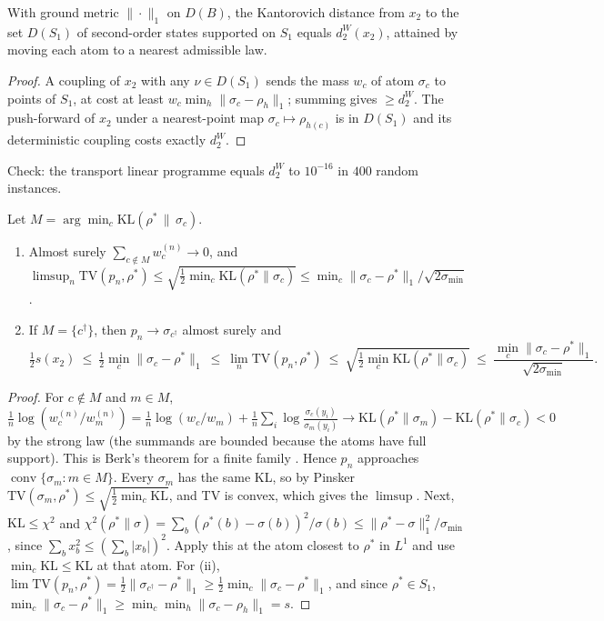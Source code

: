\begin{lemma}\label{lem:d2w}
With ground metric $\|\cdot\|_1$ on $D(B)$, the Kantorovich distance from $x_2$ to the set $D(S_1)$ of second-order states supported on $S_1$ equals $d_2^W(x_2)$, attained by moving each atom to a nearest admissible law.
\end{lemma}
\begin{proof}
A coupling of $x_2$ with any $\nu\in D(S_1)$ sends the mass $w_c$ of atom $\sigma_c$ to points of $S_1$, at cost at least $w_c\min_h\|\sigma_c-\rho_h\|_1$; summing gives $\ge d_2^W$. The push-forward of $x_2$ under a nearest-point map $\sigma_c\mapsto\rho_{h(c)}$ is in $D(S_1)$ and its deterministic coupling costs exactly $d_2^W$.
\end{proof}
Check: the transport linear programme equals $d_2^W$ to $10^{-16}$ in $400$ random instances.

\begin{theorem}\label{thm:claimlimit}
Let $M=\arg\min_c\mathrm{KL}(\rho^*\,\|\,\sigma_c)$.
\begin{enumerate}[label=(\roman*)]
  \item Almost surely $\sum_{c\notin M}w_c^{(n)}\to0$, and $\limsup_n\mathrm{TV}(p_n,\rho^*)\le\sqrt{\tfrac12\min_c\mathrm{KL}(\rho^*\|\sigma_c)}\le\min_c\|\sigma_c-\rho^*\|_1/\sqrt{2\sigma_{\min}}$.
  \item If $M=\{c^\dagger\}$, then $p_n\to\sigma_{c^\dagger}$ almost surely and
  \[\tfrac12 s(x_2)\ \le\ \tfrac12\min_c\|\sigma_c-\rho^*\|_1\ \le\ \lim_n\mathrm{TV}(p_n,\rho^*)\ \le\ \sqrt{\tfrac12\min_c\mathrm{KL}(\rho^*\|\sigma_c)}\ \le\ \frac{\min_c\|\sigma_c-\rho^*\|_1}{\sqrt{2\sigma_{\min}}}.\]
\end{enumerate}
\end{theorem}
\begin{proof}
For $c\notin M$ and $m\in M$, $\frac1n\log(w^{(n)}_c/w^{(n)}_m)=\frac1n\log(w_c/w_m)+\frac1n\sum_i\log\frac{\sigma_c(y_i)}{\sigma_m(y_i)}\to\mathrm{KL}(\rho^*\|\sigma_m)-\mathrm{KL}(\rho^*\|\sigma_c)<0$ by the strong law (the summands are bounded because the atoms have full support). This is Berk's theorem for a finite family \cite{berk66,kleijnvdv06}. Hence $p_n$ approaches $\operatorname{conv}\{\sigma_m:m\in M\}$. Every $\sigma_m$ has the same KL, so by Pinsker $\mathrm{TV}(\sigma_m,\rho^*)\le\sqrt{\frac12\min_c\mathrm{KL}}$, and TV is convex, which gives the $\limsup$. Next, $\mathrm{KL}\le\chi^2$ \cite{gibbssu02} and $\chi^2(\rho^*\|\sigma)=\sum_b(\rho^*(b)-\sigma(b))^2/\sigma(b)\le\|\rho^*-\sigma\|_1^2/\sigma_{\min}$, since $\sum_bx_b^2\le(\sum_b|x_b|)^2$. Apply this at the atom closest to $\rho^*$ in $L^1$ and use $\min_c\mathrm{KL}\le\mathrm{KL}$ at that atom. For (ii), $\lim\mathrm{TV}(p_n,\rho^*)=\frac12\|\sigma_{c^\dagger}-\rho^*\|_1\ge\frac12\min_c\|\sigma_c-\rho^*\|_1$, and since $\rho^*\in S_1$, $\min_c\|\sigma_c-\rho^*\|_1\ge\min_c\min_h\|\sigma_c-\rho_h\|_1=s$.
\end{proof}


